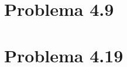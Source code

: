 \documentclass{article}
\begin{document}

\section*{Problema 4.9}

%
%
%
%


\section*{Problema 4.19}

%
%
%
%
%
\end{document}
